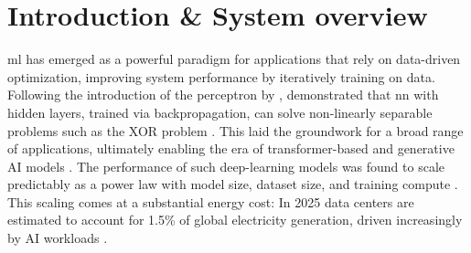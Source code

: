\section{Introduction \& System overview}

\Gls{ml} has emerged as a powerful paradigm for applications that rely on data-driven optimization, improving system performance by iteratively training on data. Following the introduction of the perceptron by \citeauthor{rosenblattPerceptron1958}, \citeauthor{rumelhartLearningRepresentationsBackpropagating1986} demonstrated that \gls{nn} with hidden layers, trained via backpropagation, can solve non-linearly separable problems such as the XOR problem \cite{rosenblattPerceptron1958,rumelhartLearningRepresentationsBackpropagating1986}. 
This laid the groundwork for a broad range of applications, ultimately enabling the era of transformer-based \cite{vaswaniAttentionAllYou2017} and generative AI models \cite{brownLanguageModelsAre2020a, radfordImprovingLanguageUnderstanding}. 
The performance of such deep-learning models was found to scale predictably as a power law with model size, dataset size, and training compute \cite{kaplanScalingLawsNeural2020, hoffmannTrainingComputeoptimalLarge2022}.
This scaling comes at a substantial energy cost: In 2025 data centers are estimated to account for 1.5\% of global electricity generation, driven increasingly by AI workloads \cite{OurWorldInData, samborskaScalingHowIncreasing2025}.


